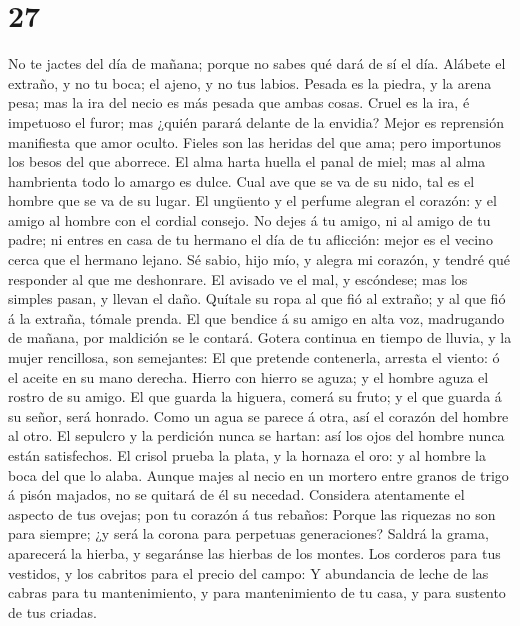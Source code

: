 \hypertarget{section-26}{%
\section{27}\label{section-26}}

 No te jactes del día de mañana; porque no sabes qué dará
de sí el día.  Alábete el extraño, y no tu boca; el ajeno,
y no tus labios.  Pesada es la piedra, y la arena pesa;
mas la ira del necio es más pesada que ambas cosas.  Cruel
es la ira, é impetuoso el furor; mas ¿quién parará delante de la
envidia?  Mejor es reprensión manifiesta que amor oculto.
 Fieles son las heridas del que ama; pero importunos los
besos del que aborrece.  El alma harta huella el panal de
miel; mas al alma hambrienta todo lo amargo es dulce. 
Cual ave que se va de su nido, tal es el hombre que se va de su lugar.
 El ungüento y el perfume alegran el corazón: y el amigo
al hombre con el cordial consejo.  No dejes á tu amigo,
ni al amigo de tu padre; ni entres en casa de tu hermano el día de tu
aflicción: mejor es el vecino cerca que el hermano lejano.
 Sé sabio, hijo mío, y alegra mi corazón, y tendré qué
responder al que me deshonrare.  El avisado ve el mal, y
escóndese; mas los simples pasan, y llevan el daño. 
Quítale su ropa al que fió al extraño; y al que fió á la extraña, tómale
prenda.  El que bendice á su amigo en alta voz,
madrugando de mañana, por maldición se le contará. 
Gotera continua en tiempo de lluvia, y la mujer rencillosa, son
semejantes:  El que pretende contenerla, arresta el
viento: ó el aceite en su mano derecha.  Hierro con
hierro se aguza; y el hombre aguza el rostro de su amigo.
 El que guarda la higuera, comerá su fruto; y el que
guarda á su señor, será honrado.  Como un agua se parece
á otra, así el corazón del hombre al otro.  El sepulcro y
la perdición nunca se hartan: así los ojos del hombre nunca están
satisfechos.  El crisol prueba la plata, y la hornaza el
oro: y al hombre la boca del que lo alaba.  Aunque majes
al necio en un mortero entre granos de trigo á pisón majados, no se
quitará de él su necedad.  Considera atentamente el
aspecto de tus ovejas; pon tu corazón á tus rebaños: 
Porque las riquezas no son para siempre; ¿y será la corona para
perpetuas generaciones?  Saldrá la grama, aparecerá la
hierba, y segaránse las hierbas de los montes.  Los
corderos para tus vestidos, y los cabritos para el precio del campo:
 Y abundancia de leche de las cabras para tu
mantenimiento, y para mantenimiento de tu casa, y para sustento de tus
criadas.

